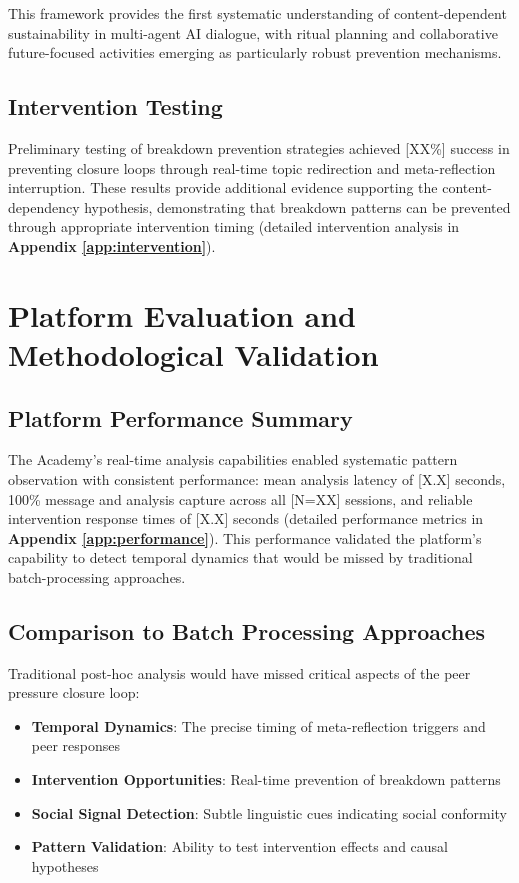 \documentclass[11pt,letterpaper]{article}
\newcommand{\theacademy}{The Academy}
\newcommand{\totalSessions}{[N=XX]} %
\newcommand{\interventionSuccessRate}{[XX\%]} %
\begin{document}
This framework provides the first systematic understanding of content-dependent sustainability in multi-agent AI dialogue, with ritual planning and collaborative future-focused activities emerging as particularly robust prevention mechanisms.

\subsection{Intervention Testing}

Preliminary testing of breakdown prevention strategies achieved \interventionSuccessRate{} success in preventing closure loops through real-time topic redirection and meta-reflection interruption. These results provide additional evidence supporting the content-dependency hypothesis, demonstrating that breakdown patterns can be prevented through appropriate intervention timing (detailed intervention analysis in \textbf{Appendix \ref{app:intervention}}).

\section{Platform Evaluation and Methodological Validation}

\subsection{Platform Performance Summary}

\theacademy{}'s real-time analysis capabilities enabled systematic pattern observation with consistent performance: mean analysis latency of [X.X] seconds, 100\% message and analysis capture across all \totalSessions{} sessions, and reliable intervention response times of [X.X] seconds (detailed performance metrics in \textbf{Appendix \ref{app:performance}}). This performance validated the platform's capability to detect temporal dynamics that would be missed by traditional batch-processing approaches.

\subsection{Comparison to Batch Processing Approaches}

Traditional post-hoc analysis would have missed critical aspects of the peer pressure closure loop:

\begin{itemize}
    \item \textbf{Temporal Dynamics}: The precise timing of meta-reflection triggers and peer responses
    \item \textbf{Intervention Opportunities}: Real-time prevention of breakdown patterns
    \item \textbf{Social Signal Detection}: Subtle linguistic cues indicating social conformity
    \item \textbf{Pattern Validation}: Ability to test intervention effects and causal hypotheses
\end{itemize}
\end{document}
